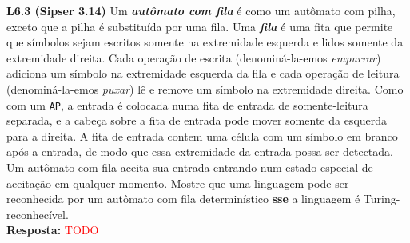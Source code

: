 
\noindent \textbf{L6.3 (Sipser 3.14)} Um \textbf{\textit{autômato com fila}} é como um autômato com pilha, exceto que a pilha é substituída por uma fila. Uma \textbf{\textit{fila}} é uma fita que permite que símbolos sejam escritos somente na extremidade esquerda e lidos somente da extremidade direita. Cada operação de escrita (denominá-la-emos  \textit{empurrar}) adiciona um símbolo na extremidade esquerda da fila e cada operação de leitura (denominá-la-emos  \textit{puxar}) lê e remove um símbolo na extremidade direita. Como com um \texttt{AP}, a entrada é colocada numa fita de entrada de somente-leitura separada, e a cabeça sobre a fita de entrada pode mover somente da esquerda para a direita. A fita de entrada contem uma célula com um símbolo em branco após a entrada, de modo que essa extremidade da entrada possa ser detectada. Um autômato com fila aceita sua entrada entrando num estado especial de aceitação em qualquer momento. Mostre que uma linguagem pode ser reconhecida por um autômato com fila determinístico \textbf{sse} a linguagem é Turing-reconhecível.\\[3pt]
\textbf{Resposta: } \textcolor{red}{TODO}